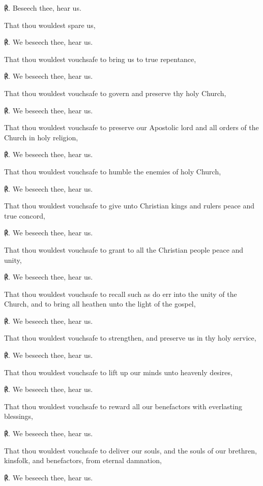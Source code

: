 \begin{multicols}{2}
℟. Beseech thee, hear us.\par\noindent
That thou wouldest spare us,\par
℟. We beseech thee, hear us.\par\noindent
That thou wouldest vouchsafe to bring us to true repentance,\par
℟. We beseech thee, hear us.\par\noindent
That thou wouldest vouchsafe to govern and preserve thy holy Church,\par
℟. We beseech thee, hear us.\par\noindent
That thou wouldest vouchsafe to preserve our Apostolic lord and all orders of the Church in holy religion,\par
℟. We beseech thee, hear us.\par\noindent
That thou wouldest vouchsafe to humble the enemies of holy Church,\par
℟. We beseech thee, hear us.\par\noindent
That thou wouldest vouchsafe to give unto Christian kings and rulers peace and true concord,\par
℟. We beseech thee, hear us.\par\noindent
That thou wouldest vouchsafe to grant to all the Christian people peace and unity,\par
℟. We beseech thee, hear us.\par\noindent
That thou wouldest vouchsafe to recall such as do err into the unity of the Church, and to bring all heathen unto the light of the gospel,\par
℟. We beseech thee, hear us.\par\noindent
That thou wouldest vouchsafe to strengthen, and preserve us in thy holy service,\par
℟. We beseech thee, hear us.\par\noindent
That thou wouldest vouchsafe to lift up our minds unto heavenly desires,\par
℟. We beseech thee, hear us.\par\noindent
That thou wouldest vouchsafe to reward all our benefactors with everlasting blessings,\par
℟. We beseech thee, hear us.\par\noindent
That thou wouldest vouchsafe to deliver our souls, and the souls of our brethren, kinsfolk, and benefactors, from eternal damnation,\par
℟. We beseech thee, hear us.\par\noindent

\end{multicols}
